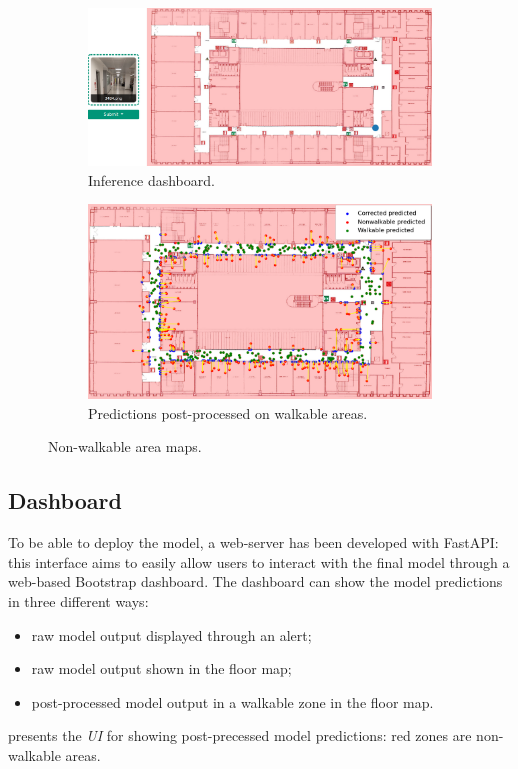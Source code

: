 \begin{figure}[htbp]
    \begin{subfigure}[b]{0.542\textwidth}
        \includegraphics[width=1\textwidth]{./imgs/dashboard.png}
        \caption{Inference dashboard.}
        \label{fig:dashboard}
    \end{subfigure}
    \hfill
    \begin{subfigure}[b]{0.438\textwidth}
        \includegraphics[width=1\textwidth]{./imgs/walkable_postprocess.png}
        \caption{Predictions post-processed on walkable areas.}
        \label{fig:trajectory-mapnet-walkable}
    \end{subfigure}
    \caption{Non-walkable area maps.}
\end{figure}

\subsection{Dashboard}
To be able to deploy the model, a web-server has been developed with FastAPI: this interface aims to easily allow users to interact with the final model through a web-based Bootstrap dashboard.
The dashboard can show the model predictions in three different ways:
\begin{itemize}
    \item raw model output displayed through an alert;
    \item raw model output shown in the floor map;
    \item post-processed model output in a walkable zone in the floor map.
\end{itemize}
 presents the \emph{UI} for showing post-precessed model predictions: red zones are non-walkable areas.
